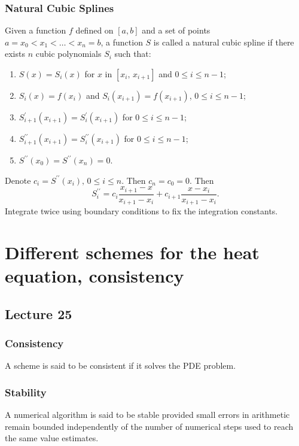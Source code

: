 \documentclass{article}
\begin{document}
\subsubsection{Natural Cubic Splines}
Given a function $f$ defined on $[a,b]$ and a set of points $a=x_0<x_1<\ldots<x_n=b$, a function $S$ is called a natural cubic spline if there exists $n$ cubic polynomials $S_i$ such that:
\begin{enumerate}
    \item $ S(x) = S_i(x) $ for $x$ in $[x_i,\,x_{i+1}]$ and $0\leq i\leq n-1$;
    \item $S_i(x) = f(x_i)$ and $S_i(x_{i+1}) = f(x_{i+1})$, $0\leq i\leq n-1$;
    \item $S_{i+1}^\prime(x_{i+1}) = S_i^\prime(x_{i+1})$ for $0\leq i\leq n-1$;
    \item $S_{i+1}^{\prime\prime}(x_{i+1}) = S_i^{\prime\prime}(x_{i+1})$ for $0\leq i\leq n-1$;
    \item $S^{\prime\prime}(x_0) = S^{\prime\prime}(x_n) = 0$.
\end{enumerate}
Denote $c_i = S^{\prime\prime}(x_i),\,0\leq i\leq n$. Then $c_n=c_0=0$. Then
\begin{equation}
    S^{\prime\prime}_i = c_i\frac{x_{i+1} - x}{x_{i+1} - x_i} + c_{i+1}\frac{x-x_i}{x_{i+1} - x_i}.
\end{equation}
Integrate twice using boundary conditions to fix the integration constants.


\section{Different schemes for the heat equation, consistency}
\subsection{Lecture 25}
\subsubsection{Consistency}
A scheme is said to be consistent if it solves the PDE problem.

\subsubsection{Stability}
A numerical algorithm is said to be stable provided small errors in arithmetic remain bounded independently of the number of numerical steps used to reach the same value estimates.
\end{document}
